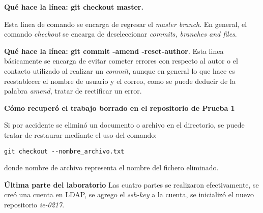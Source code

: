 \documentclass{article}
\begin{document}
\textbf{Qu\' e hace la l\' inea: git checkout master.}

Esta linea de comando se encarga de regresar el \textit{master branch}.
En general, el comando \textit{checkout} se encarga de deseleccionar \textit{commits, branches and files}.

\textbf{Qu\' e hace la l\' inea: git commit -amend -reset-author}.
Esta linea b\' asicamente se encarga de evitar cometer errores con respecto al autor o el contacto utilizado al realizar un \textit{commit}, aunque en general lo que hace es reestablecer el nombre de usuario y el correo, como se puede deducir de la palabra \textit{amend}, tratar de rectificar un error.

\textbf{C\' omo recuper\' o el trabajo borrado en el repositorio de Prueba 1}

Si por accidente se elimin\' o un documento o archivo en el directorio, se puede tratar de restaurar mediante el uso del comando: 
\begin{verbatim}
git checkout --nombre_archivo.txt
\end{verbatim}
donde nombre de archivo representa el nombre del fichero eliminado.


\textbf{\' Ultima parte del laboratorio}
Las cuatro partes se realizaron efectivamente, se cre\' o una cuenta en LDAP, se agrego el \textit{ssh-key} a la cuenta, se inicializ\' o el nuevo repositorio \textit{ie-0217}.
\end{document}
